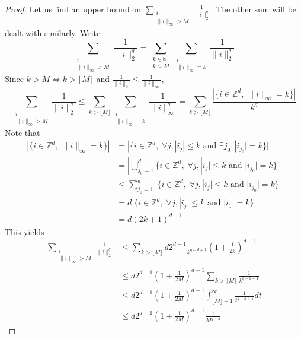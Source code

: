 \documentclass[12pt]{report}
\theoremstyle{definition}
\theoremstyle{remark}
\begin{document}
\begin{proof}
\noindent Let us find an upper bound on
$\displaystyle \sum \limits_{\substack{i\\ \|i\|_\infty > M}} \frac{1}{\|i\|_2^q}$. The other sum will be dealt with similarly. Write 
$$\sum \limits_{\substack{i\\ \|i\|_\infty > M}} \frac{1}{\|i\|_2^q} = \sum \limits_{\substack{k\in \mathbb N\\ k > M}} \sum \limits_{\substack{i\\ \|i\|_\infty = k}}\frac{1}{\|i\|_2^q}
$$
Since $k>M\iff k>\lfloor M\rfloor$ and $\displaystyle \frac{1}{\|i\|_2}\leq \frac{1}{\|i\|_\infty}$, 
$$ 
\sum \limits_{\substack{i\\ \|i\|_\infty > M}} \frac{1}{\|i\|_2^q} \leq 
\sum \limits_{ k > \lfloor M \rfloor} \sum \limits_{\substack{i\\ \|i\|_\infty = k}}\frac{1}{\|i\|_\infty^q} = \sum \limits_{ k > \lfloor M \rfloor} \frac{|\{i\in \mathbb Z^d,\; \|i\|_\infty=k \}|}{k^q}
$$
Note that 
$$\begin{aligned}
|\{i\in \mathbb Z^d,\; \|i\|_\infty=k \}| &= |\{i\in \mathbb Z^d,\; \forall j, |i_j|\leq k \text{ and } \exists j_0, |i_{j_0}|=k\}|\\
&= |\bigcup_{j_0=1}^d \{i\in \mathbb Z^d,\; \forall j, |i_j|\leq k \text{ and } |i_{j_0}|=k\}|\\
&\leq \sum_{j_0=1}^d |\{i\in \mathbb Z^d,\; \forall j, |i_j|\leq k \text{ and } |i_{j_0}|=k\}|\\
&= d |\{i\in \mathbb Z^d,\; \forall j, |i_j|\leq k \text{ and } |i_{1}|=k\}|\\
&= d(2k+1)^{d-1}
\end{aligned}
$$
This yields 
$$
\begin{aligned}
\sum \limits_{\substack{i\\ \|i\|_\infty > M}} \frac{1}{\|i\|_2^q} 
&\leq  \sum \limits_{ k > \lfloor M \rfloor} d 2^{d-1} \frac{1}{k^{q-d+1}} \left(1+\frac{1}{2k} \right)^{d-1} \\
&\leq d 2^{d-1} \left(1+\frac{1}{2M} \right)^{d-1} \sum \limits_{ k > \lfloor M \rfloor} \frac{1}{k^{q-d+1}} \\
&\leq d 2^{d-1} \left(1+\frac{1}{2M} \right)^{d-1} \int_{ \lfloor M \rfloor+1}^\infty \frac{1}{t^{q-d+1}} dt\\
&\leq d 2^{d-1} \left(1+\frac{1}{2M} \right)^{d-1}  \frac{1}{M^{q-d}}
\end{aligned}
$$


\end{proof}
\end{document}
